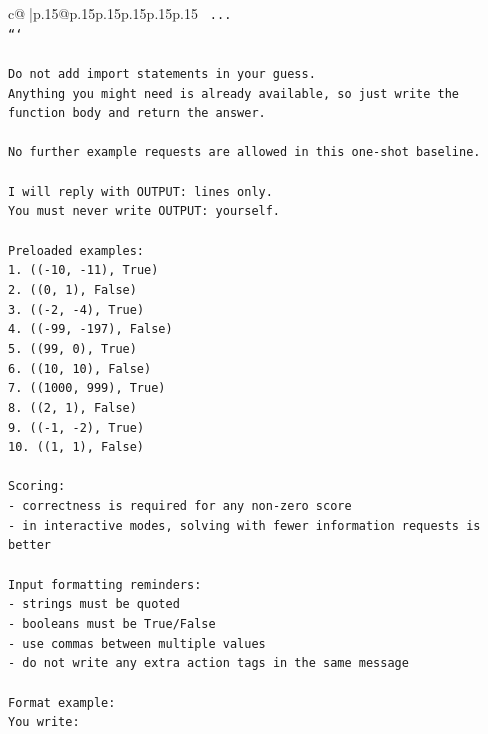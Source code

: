 \documentclass{article}
\begin{document}
{\begin{supertabular}{c@{$\;$}|p{.15\linewidth}@{}p{.15\linewidth}p{.15\linewidth}p{.15\linewidth}p{.15\linewidth}p{.15\linewidth}}
{{{\texttt{    ...} \\
\texttt{```} \\
\\ 
\texttt{Do not add import statements in your guess.} \\
\texttt{Anything you might need is already available, so just write the function body and return the answer.} \\
\\ 
\texttt{No further example requests are allowed in this one{-}shot baseline.} \\
\\ 
\texttt{I will reply with OUTPUT: lines only.} \\
\texttt{You must never write OUTPUT: yourself.} \\
\\ 
\texttt{Preloaded examples:} \\
\texttt{1. (({-}10, {-}11), True)} \\
\texttt{2. ((0, 1), False)} \\
\texttt{3. (({-}2, {-}4), True)} \\
\texttt{4. (({-}99, {-}197), False)} \\
\texttt{5. ((99, 0), True)} \\
\texttt{6. ((10, 10), False)} \\
\texttt{7. ((1000, 999), True)} \\
\texttt{8. ((2, 1), False)} \\
\texttt{9. (({-}1, {-}2), True)} \\
\texttt{10. ((1, 1), False)} \\
\\ 
\texttt{Scoring:} \\
\texttt{{-} correctness is required for any non{-}zero score} \\
\texttt{{-} in interactive modes, solving with fewer information requests is better} \\
\\ 
\texttt{Input formatting reminders:} \\
\texttt{{-} strings must be quoted} \\
\texttt{{-} booleans must be True/False} \\
\texttt{{-} use commas between multiple values} \\
\texttt{{-} do not write any extra action tags in the same message} \\
\\ 
\texttt{Format example:} \\
\texttt{You write:} \\
}}}
\end{supertabular}}
\end{document}
